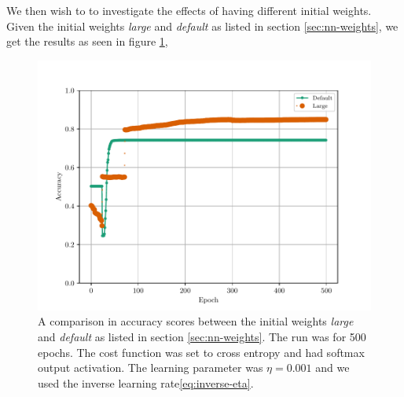 We then wish to to investigate the effects of having different initial weights. Given the initial weights \textit{large} and \textit{default} as listed in section \ref{sec:nn-weights}, we get the results as seen in figure \ref{fig:mlp-epoch-init-weights},
\begin{figure}[H]
    \centering
    \includegraphics[scale=1.0]{../fig/mlp_epoch_weight_inits.pdf}
    \caption{A comparison in accuracy scores between the initial weights \textit{large} and \textit{default} as listed in section \ref{sec:nn-weights}. The run was for 500 epochs. The cost function was set to cross entropy and had softmax output activation. The learning parameter was $\eta=0.001$ and we used the inverse learning rate\eqref{eq:inverse-eta}.}
    \label{fig:mlp-epoch-init-weights}
\end{figure}

